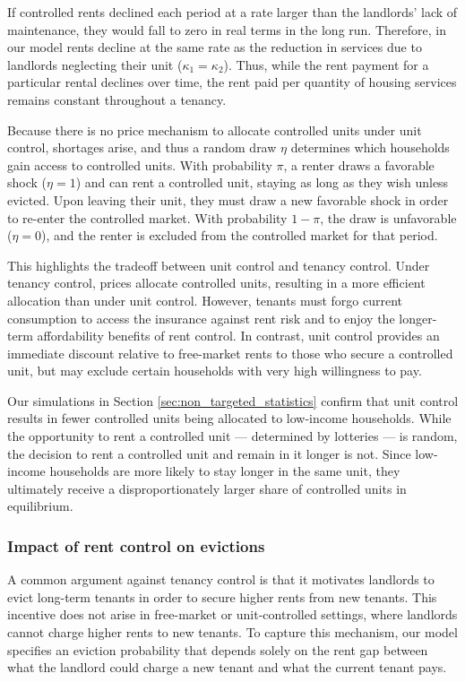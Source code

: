\documentclass[parskip=full]{article}
\begin{document}
If controlled rents declined each period at a rate larger than the landlords' lack of maintenance, they would fall to zero in real terms in the long run. Therefore, in our model rents decline at the same rate as the reduction in services due to landlords neglecting their unit ($\kappa_1=\kappa_2$). Thus, while the rent payment for a particular rental declines over time, the rent paid per quantity of housing services remains constant throughout a tenancy. 

Because there is no price mechanism to allocate controlled units under unit control, shortages arise, and thus a random draw $\eta$ determines which households gain access to controlled units. With probability $\pi$, a renter draws a favorable shock ($\eta=1$) and can rent a controlled unit, staying as long as they wish unless evicted. Upon leaving their unit, they must draw a new favorable shock in order to re-enter the controlled market. With probability $1-\pi$, the draw is unfavorable ($\eta=0$), and the renter is excluded from the controlled market for that period. 

This highlights the tradeoff between unit control and tenancy control. Under tenancy control, prices allocate controlled units, resulting in a more efficient allocation than under unit control. However, tenants must forgo current consumption to access the insurance against rent risk and to enjoy the longer-term affordability benefits of rent control. In contrast, unit control provides an immediate discount relative to free-market rents to those who secure a controlled unit, but may exclude certain households with very high willingness to pay. 

Our simulations in Section \ref{sec:non_targeted_statistics} confirm that unit control results in fewer controlled units being allocated to low-income households. While the opportunity to rent a controlled unit — determined by lotteries — is random, the decision to rent a controlled unit and remain in it longer is not. Since low-income households are more likely to stay longer in the same unit, they ultimately receive a disproportionately larger share of controlled units in equilibrium.

\subsubsection{Impact of rent control on evictions}

A common argument against tenancy control is that it motivates landlords to evict long-term tenants in order to secure higher rents from new tenants. This incentive does not arise in free-market or unit-controlled settings, where landlords cannot charge higher rents to new tenants. To capture this mechanism, our model specifies an eviction probability that depends solely on the rent gap between what the landlord could charge a new tenant and what the current tenant pays.
\end{document}
